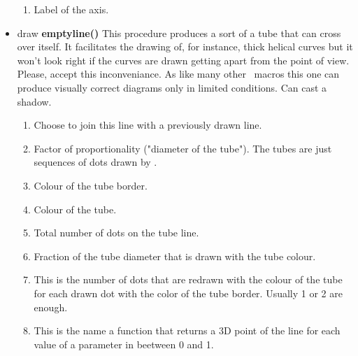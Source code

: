 \begin{itemize}
\begin{enumerate}
\item {} Label of the  axis.
\end{enumerate}
\item draw {\bfseries emptyline()} This procedure produces
a sort of a tube that can cross over itself. It
facilitates the drawing of, for instance, thick
helical curves but it won't
look right if the curves are drawn getting apart from
the point of view. Please, accept this inconveniance.
As like many other \FP\ macros this one
can produce visually correct diagrams only in limited
conditions. Can cast a shadow.
\begin{enumerate}
\item {} Choose  to join
this line with a previously drawn line.
\item {} Factor of proportionality
("diameter of the tube"). The tubes are just
sequences of dots drawn by .
\item {} Colour of the tube border.
\item {} Colour of the tube.
\item {} Total number of dots on the
tube line.
\item {} Fraction of the tube diameter
that is drawn with the tube colour.
\item {} This is the number of dots
that are redrawn with the colour of the tube for
each drawn dot with the color of the tube
border. Usually 1 or 2 are enough.
\item {} This is the name a function
that returns a 3D point of the line for each value
of a parameter in beetween 0 and 1.
\end{enumerate}


\end{itemize}
